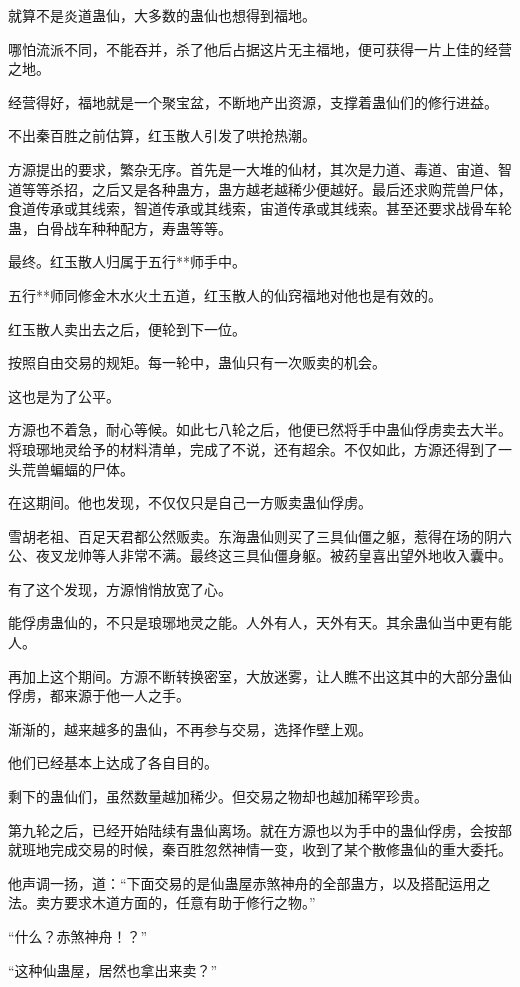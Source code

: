 \begin{this_body}
就算不是炎道蛊仙，大多数的蛊仙也想得到福地。

哪怕流派不同，不能吞并，杀了他后占据这片无主福地，便可获得一片上佳的经营之地。

经营得好，福地就是一个聚宝盆，不断地产出资源，支撑着蛊仙们的修行进益。

不出秦百胜之前估算，红玉散人引发了哄抢热潮。

方源提出的要求，繁杂无序。首先是一大堆的仙材，其次是力道、毒道、宙道、智道等等杀招，之后又是各种蛊方，蛊方越老越稀少便越好。最后还求购荒兽尸体，食道传承或其线索，智道传承或其线索，宙道传承或其线索。甚至还要求战骨车轮蛊，白骨战车种种配方，寿蛊等等。

最终。红玉散人归属于五行**师手中。

五行**师同修金木水火土五道，红玉散人的仙窍福地对他也是有效的。

红玉散人卖出去之后，便轮到下一位。

按照自由交易的规矩。每一轮中，蛊仙只有一次贩卖的机会。

这也是为了公平。

方源也不着急，耐心等候。如此七八轮之后，他便已然将手中蛊仙俘虏卖去大半。将琅琊地灵给予的材料清单，完成了不说，还有超余。不仅如此，方源还得到了一头荒兽蝙蝠的尸体。

在这期间。他也发现，不仅仅只是自己一方贩卖蛊仙俘虏。

雪胡老祖、百足天君都公然贩卖。东海蛊仙则买了三具仙僵之躯，惹得在场的阴六公、夜叉龙帅等人非常不满。最终这三具仙僵身躯。被药皇喜出望外地收入囊中。

有了这个发现，方源悄悄放宽了心。

能俘虏蛊仙的，不只是琅琊地灵之能。人外有人，天外有天。其余蛊仙当中更有能人。

再加上这个期间。方源不断转换密室，大放迷雾，让人瞧不出这其中的大部分蛊仙俘虏，都来源于他一人之手。

渐渐的，越来越多的蛊仙，不再参与交易，选择作壁上观。

他们已经基本上达成了各自目的。

剩下的蛊仙们，虽然数量越加稀少。但交易之物却也越加稀罕珍贵。

第九轮之后，已经开始陆续有蛊仙离场。就在方源也以为手中的蛊仙俘虏，会按部就班地完成交易的时候，秦百胜忽然神情一变，收到了某个散修蛊仙的重大委托。

他声调一扬，道：“下面交易的是仙蛊屋赤煞神舟的全部蛊方，以及搭配运用之法。卖方要求木道方面的，任意有助于修行之物。”

“什么？赤煞神舟！？”

“这种仙蛊屋，居然也拿出来卖？”


\end{this_body}
